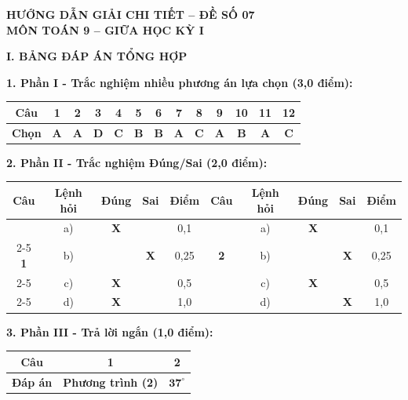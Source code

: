 \documentclass[12pt,a4paper]{article}
\begin{document}
\begin{center}
  \textbf{\Large HƯỚNG DẪN GIẢI CHI TIẾT -- ĐỀ SỐ 07}\\
  \textbf{\large MÔN TOÁN 9 -- GIỮA HỌC KỲ I}
\end{center}
\vspace{2mm}

\noindent\textbf{\large I. BẢNG ĐÁP ÁN TỔNG HỢP}

\vspace{1mm}
\noindent\textbf{1. Phần I - Trắc nghiệm nhiều phương án lựa chọn (3,0 điểm):}
\begin{center}
\begin{tabular}{|c|c|c|c|c|c|c|c|c|c|c|c|c|}
\hline
\textbf{Câu} & \textbf{1} & \textbf{2} & \textbf{3} & \textbf{4} & \textbf{5} & \textbf{6} & \textbf{7} & \textbf{8} & \textbf{9} & \textbf{10} & \textbf{11} & \textbf{12} \\
\hline
\textbf{Chọn} & \textbf{A} & \textbf{A} & \textbf{D} & \textbf{C} & \textbf{B} & \textbf{B} & \textbf{A} & \textbf{C} & \textbf{A} & \textbf{B} & \textbf{A} & \textbf{C} \\
\hline
\end{tabular}
\end{center}
\vspace{1mm}

\noindent\textbf{2. Phần II - Trắc nghiệm Đúng/Sai (2,0 điểm):}
\begin{center}
\begin{tabular}{|c|c|c|c|c||c|c|c|c|c|}
\hline
\textbf{Câu} & \textbf{Lệnh hỏi} & \textbf{Đúng} & \textbf{Sai} & \textbf{Điểm} & \textbf{Câu} & \textbf{Lệnh hỏi} & \textbf{Đúng} & \textbf{Sai} & \textbf{Điểm} \\
\hline
 & a) & \textbf{X} & & 0,1 & & a) & \textbf{X} & & 0,1 \\
\cline{2-5}\cline{7-10}
\textbf{1} & b) & & \textbf{X} & 0,25 & \textbf{2} & b) & & \textbf{X} & 0,25 \\
\cline{2-5}\cline{7-10}
 & c) & \textbf{X} & & 0,5 & & c) & \textbf{X} & & 0,5 \\
\cline{2-5}\cline{7-10}
 & d) & \textbf{X} & & 1,0 & & d) & & \textbf{X} & 1,0 \\
\hline
\end{tabular}
\end{center}
\vspace{1mm}

\noindent\textbf{3. Phần III - Trả lời ngắn (1,0 điểm):}
\begin{center}
\begin{tabular}{|c|c|c|}
\hline
\textbf{Câu} & \textbf{1} & \textbf{2} \\
\hline
\textbf{Đáp án} & \textbf{Phương trình (2)} & $\mathbf{37^\circ}$ \\
\hline
\end{tabular}
\end{center}
\vspace{3mm}
\end{document}
